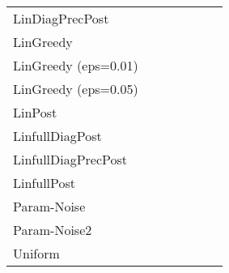 \documentclass{article} \usepackage{iclr2018_conference,times}
\begin{document}
\begin{landscape}
\begin{table}[ht]
\begin{tabular}{lllllll}
LinDiagPrecPost & & & \bm{}& & \bm{}&  \\
LinGreedy & & & & & \bm{}&  \\
LinGreedy (eps=0.01) & \bm{}& & & & & \bm{} \\
LinGreedy (eps=0.05) & & & & & &  \\
LinPost & & & \bm{}& & \bm{}&  \\
LinfullDiagPost & & & & & &  \\
LinfullDiagPrecPost & & & \bm{}& & & \bm{} \\
LinfullPost & \bm{}& & \bm{}& & & \bm{} \\
Param-Noise & & \bm{}& & & &  \\
Param-Noise2 & & \bm{}& & & &  \\
Uniform & & & & & &  \\
    \bottomrule
  \end{tabular}

 \end{table}
\end{landscape}
\end{document}
